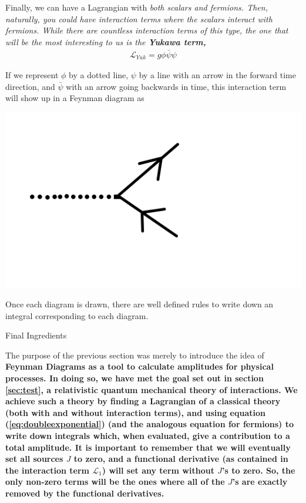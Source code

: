 \documentclass[12pt,epsf]{article}
\makeatletter
\def\subsection{\@startsection{subsection}{2}{\z@}{2.3ex plus .2ex}
 {2.3ex plus .2ex}{\bf}}
\makeatother
\begin{document}
Finally, we can have a Lagrangian with \it both \rm scalars and
fermions.  Then, naturally, you could have interaction terms where the
scalars interact with fermions.  While there are countless interaction
terms of this type, the one that will be the most interesting to us is
the \bf Yukawa \rm term,
\begin{eqnarray}
\mathcal{L}_{Yuk} = g\phi \bar \psi \psi \label{eq:yukawa}
\end{eqnarray}

If we represent $\phi$ by a dotted line, $\psi$ by a line with an arrow
in the forward time direction, and $\bar \psi$ with an arrow going
backwards in time, this interaction term will show up in a Feynman
diagram as 
\begin{center}
\includegraphics[scale = .4]{feynmandiagram8.png}
\end{center} 

Once each diagram is drawn, there are well defined rules to write down
an integral corresponding to each diagram.  

\subsection{Final Ingredients}

The purpose of the previous section was merely to introduce the idea of
\bf Feynman Diagrams \rm as a tool to calculate amplitudes for physical
processes.  In doing so, we have met the goal set out in section
\ref{sec:test}, a relativistic quantum mechanical theory of
interactions.  We achieve such a theory by finding a Lagrangian of a
classical theory (both with and without interaction terms), and using
equation (\ref{eq:doubleexponential}) (and the analogous equation for
fermions) to write down integrals which, when evaluated, give a
contribution to a total amplitude.  It is important to remember that we
will eventually set all sources $J$ to zero, and a functional
derivative (as contained in the interaction term $\mathcal{L}_1$) will
set any term without $J$'s to zero.  So, the only non-zero terms will
be the ones where all of the $J$'s are exactly removed by the
functional derivatives.  
\end{document}
